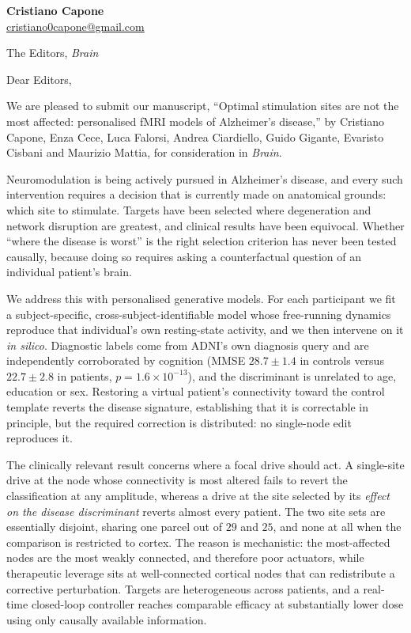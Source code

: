 \documentclass[11pt]{article}
\begin{document}
{\raggedright
\textbf{Cristiano Capone}\\
\href{mailto:cristiano0capone@gmail.com}{cristiano0capone@gmail.com}\par}

\vspace{0.6em}
{\raggedright The Editors, \textit{Brain}\par}

\vspace{0.8em}

Dear Editors,

We are pleased to submit our manuscript, ``Optimal stimulation sites are not the
most affected: personalised fMRI models of Alzheimer's disease,''
by Cristiano Capone, Enza Cece, Luca Falorsi, Andrea Ciardiello, Guido Gigante,
Evaristo Cisbani and Maurizio Mattia, for consideration in \textit{Brain}.

Neuromodulation is being actively pursued in Alzheimer's disease, and every such
intervention requires a decision that is currently made on anatomical grounds:
which site to stimulate. Targets have been selected where degeneration and
network disruption are greatest, and clinical results have been equivocal. Whether
``where the disease is worst'' is the right selection criterion has never been
tested causally, because doing so requires asking a counterfactual question of an
individual patient's brain.

We address this with personalised generative models. For each participant we fit
a subject-specific, cross-subject-identifiable model whose free-running dynamics
reproduce that individual's own resting-state activity, and we then intervene on
it \emph{in silico}. Diagnostic labels come from ADNI's own diagnosis query and
are independently corroborated by cognition (MMSE $28.7\pm1.4$ in controls versus
$22.7\pm2.8$ in patients, $p=1.6\times10^{-13}$), and the discriminant is
unrelated to age, education or sex. Restoring a virtual patient's connectivity
toward the control template reverts the disease signature, establishing that it is
correctable in principle, but the required correction is distributed: no
single-node edit reproduces it.

The clinically relevant result concerns where a focal drive should act. A
single-site drive at the node whose connectivity is most altered fails to revert
the classification at any amplitude, whereas a drive at the site selected by its
\emph{effect on the disease discriminant} reverts almost every patient. The two
site sets are essentially disjoint, sharing one parcel out of $29$ and $25$, and
none at all when the comparison is restricted to cortex. The reason is
mechanistic: the most-affected nodes are the most weakly connected, and therefore
poor actuators, while therapeutic leverage sits at well-connected cortical nodes
that can redistribute a corrective perturbation. Targets are heterogeneous across
patients, and a real-time closed-loop controller reaches comparable efficacy at
substantially lower dose using only causally available information.
\end{document}
